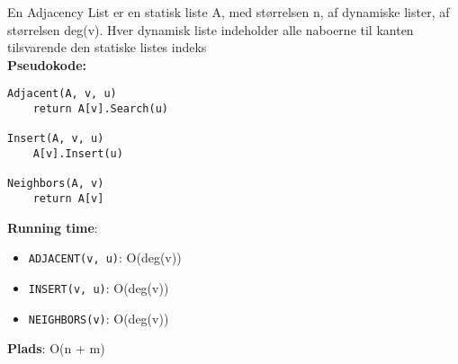 En Adjacency List er en statisk liste A, med størrelsen n, af dynamiske lister, af størrelsen deg(v). Hver dynamisk liste indeholder alle naboerne til kanten tilsvarende den statiske listes indeks\\
\textbf{Pseudokode:}
\begin{lstlisting}[frame=single, mathescape=true]
Adjacent(A, v, u)
	return A[v].Search(u)

Insert(A, v, u)
	A[v].Insert(u)

Neighbors(A, v)
	return A[v]
\end{lstlisting}
\textbf{Running time}:
\begin{itemize}
	\item \texttt{ADJACENT(v, u)}: O(deg(v))
	\item \texttt{INSERT(v, u)}: O(deg(v))
	\item \texttt{NEIGHBORS(v)}: O(deg(v))
\end{itemize}
\textbf{Plads}: O(n + m)
